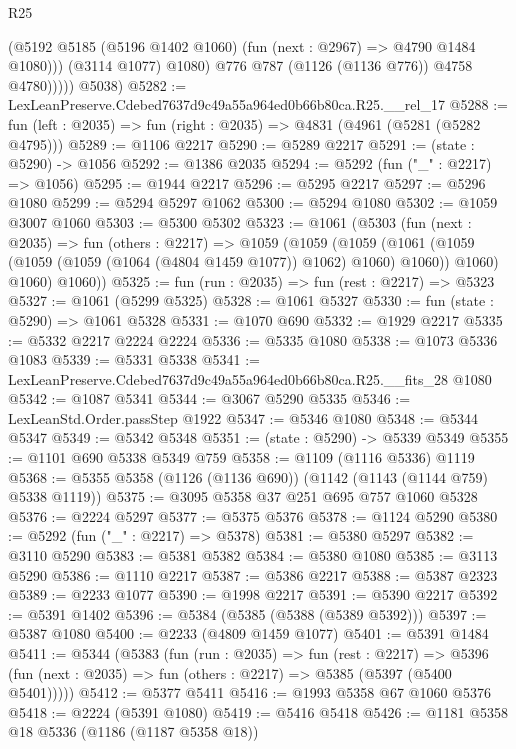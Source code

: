 \begin{lexlean}{R25}
\begin{coremodule}
                    (@5192 @5185 (@5196 @1402 @1060) (fun (next : @2967) => @4790 @1484 @1080)))
                  (@3114 @1077)
                  @1080)
                @776
                @787
                (@1126 (@1136 @776))
                @4758
                @4780)))))
      @5038)
@5282 := LexLeanPreserve.Cdebed7637d9c49a55a964ed0b66b80ca.R25.__rel_17
@5288 := fun (left : @2035) => fun (right : @2035) => @4831 (@4961 (@5281 (@5282 @4795)))
@5289 := @1106 @2217
@5290 := @5289 @2217
@5291 := (state : @5290) -> @1056
@5292 := @1386 @2035
@5294 := @5292 (fun ("_" : @2217) => @1056)
@5295 := @1944 @2217
@5296 := @5295 @2217
@5297 := @5296 @1080
@5299 := @5294 @5297 @1062
@5300 := @5294 @1080
@5302 := @1059 @3007 @1060
@5303 := @5300 @5302
@5323 := @1061
    (@5303
      (fun (next : @2035) =>
      fun (others : @2217) =>
      @1059
        (@1059
          (@1059
            (@1061 (@1059 (@1059 (@1059 (@1064 (@4804 @1459 @1077)) @1062) @1060) @1060))
            @1060)
          @1060)
        @1060))
@5325 := fun (run : @2035) => fun (rest : @2217) => @5323
@5327 := @1061 (@5299 @5325)
@5328 := @1061 @5327
@5330 := fun (state : @5290) => @1061 @5328
@5331 := @1070 @690
@5332 := @1929 @2217
@5335 := @5332 @2217 @2224 @2224
@5336 := @5335 @1080
@5338 := @1073 @5336 @1083
@5339 := @5331 @5338
@5341 := LexLeanPreserve.Cdebed7637d9c49a55a964ed0b66b80ca.R25.__fits_28 @1080
@5342 := @1087 @5341
@5344 := @3067 @5290 @5335
@5346 := LexLeanStd.Order.passStep @1922
@5347 := @5346 @1080
@5348 := @5344 @5347
@5349 := @5342 @5348
@5351 := (state : @5290) -> @5339 @5349
@5355 := @1101 @690 @5338 @5349 @759
@5358 := @1109 (@1116 @5336) @1119
@5368 := @5355 @5358 (@1126 (@1136 @690)) (@1142 (@1143 (@1144 @759) @5338 @1119))
@5375 := @3095 @5358 @37 @251 @695 @757 @1060 @5328
@5376 := @2224 @5297
@5377 := @5375 @5376
@5378 := @1124 @5290
@5380 := @5292 (fun ("_" : @2217) => @5378)
@5381 := @5380 @5297
@5382 := @3110 @5290
@5383 := @5381 @5382
@5384 := @5380 @1080
@5385 := @3113 @5290
@5386 := @1110 @2217
@5387 := @5386 @2217
@5388 := @5387 @2323
@5389 := @2233 @1077
@5390 := @1998 @2217
@5391 := @5390 @2217
@5392 := @5391 @1402
@5396 := @5384 (@5385 (@5388 (@5389 @5392)))
@5397 := @5387 @1080
@5400 := @2233 (@4809 @1459 @1077)
@5401 := @5391 @1484
@5411 := @5344
    (@5383
      (fun (run : @2035) =>
      fun (rest : @2217) =>
      @5396 (fun (next : @2035) => fun (others : @2217) => @5385 (@5397 (@5400 @5401)))))
@5412 := @5377 @5411
@5416 := @1993 @5358 @67 @1060 @5376
@5418 := @2224 (@5391 @1080)
@5419 := @5416 @5418
@5426 := @1181 @5358 @18 @5336 (@1186 (@1187 @5358 @18))

\end{coremodule}
\end{lexlean}
